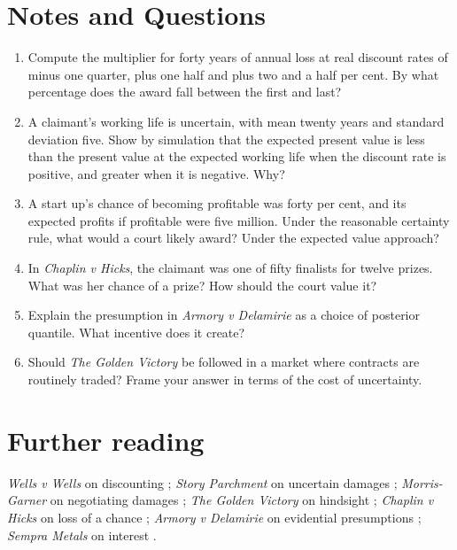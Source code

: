 \section*{Notes and Questions}
\begin{enumerate}[label=\arabic*.]
\item Compute the multiplier for forty years of annual loss at real discount rates of minus one quarter, plus one half and plus two and a half per cent. By what percentage does the award fall between the first and last?
\item A claimant's working life is uncertain, with mean twenty years and standard deviation five. Show by simulation that the expected present value is less than the present value at the expected working life when the discount rate is positive, and greater when it is negative. Why?
\item A start up's chance of becoming profitable was forty per cent, and its expected profits if profitable were five million. Under the reasonable certainty rule, what would a court likely award? Under the expected value approach?
\item In \emph{Chaplin v Hicks}, the claimant was one of fifty finalists for twelve prizes. What was her chance of a prize? How should the court value it?
\item Explain the presumption in \emph{Armory v Delamirie} as a choice of posterior quantile. What incentive does it create?
\item Should \emph{The Golden Victory} be followed in a market where contracts are routinely traded? Frame your answer in terms of the cost of uncertainty.
\end{enumerate}

\section*{Further reading}
\emph{Wells v Wells} on discounting \citep{wells1999}; \emph{Story Parchment} on uncertain damages \citep{storyparchment1931}; \emph{Morris-Garner} on negotiating damages \citep{morrisgarner2018}; \emph{The Golden Victory} on hindsight \citep{goldenvictory2007}; \emph{Chaplin v Hicks} on loss of a chance \citep{chaplin1911}; \emph{Armory v Delamirie} on evidential presumptions \citep{armory1722}; \emph{Sempra Metals} on interest \citep{sempra2007}.
